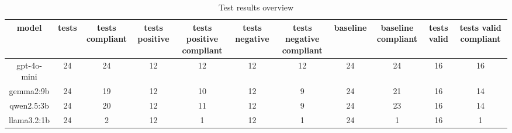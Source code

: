 
  \begin{table}[h!]
  \centering
  \begin{tabular}{|c|c|c|c|c|c|c|c|c|c|c|}
  \hline
  model & tests & tests compliant & tests positive & tests positive compliant & tests negative & tests negative compliant & baseline & baseline compliant & tests valid & tests valid compliant \\
  \hline
  gpt-4o-mini & 24 & 24 & 12 & 12 & 12 & 12 & 24 & 24 & 16 & 16\\
\hline
gemma2:9b & 24 & 19 & 12 & 10 & 12 & 9 & 24 & 21 & 16 & 14\\
\hline
qwen2.5:3b & 24 & 20 & 12 & 11 & 12 & 9 & 24 & 23 & 16 & 14\\
\hline
llama3.2:1b & 24 & 2 & 12 & 1 & 12 & 1 & 24 & 1 & 16 & 1
  \end{tabular}
  \caption{Test results overview}
  
  \end{table}
  